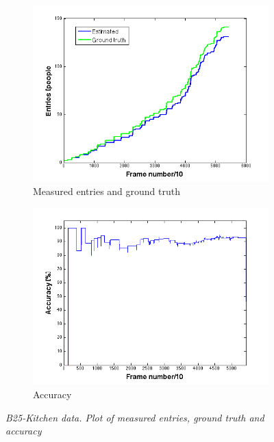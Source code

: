 \begin{figure}[H]
\centering
\begin{subfigure}{.5\textwidth}
  \centering
  \includegraphics[width=1.1\linewidth]{images/entriesGTB25.png}
  \caption{Measured entries and ground truth}
  \label{fig:sub1}
\end{subfigure}%
\begin{subfigure}{.5\textwidth}
  \centering
  \includegraphics[width=1.1\linewidth]{images/accInB25.png}
  \caption{Accuracy}
  \label{fig:sub2}
\end{subfigure}
\caption[B25-kitchen entries]{\textit{B25-Kitchen data. Plot of measured entries, ground truth and accuracy}}
\label{fig:B25-kitchen entries}
\end{figure}

